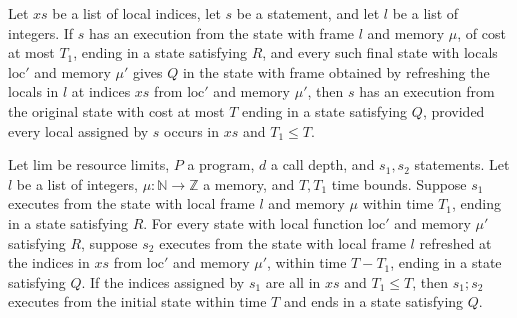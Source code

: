 \begin{theorem}
\label{Light.Ends.pieceTo}
\leanok
{}
Let $xs$ be a list of local indices, let $s$ be a statement, and let $l$ be a list of
integers. If $s$ has an execution from the state with frame $l$ and memory $\mu$, of
cost at most $T_1$, ending in a state satisfying $R$, and every such final state with
locals $\mathrm{loc}'$ and memory $\mu'$ gives $Q$ in the state with frame obtained by
refreshing the locals in $l$ at indices $xs$ from $\mathrm{loc}'$ and memory $\mu'$,
then $s$ has an execution from the original state with cost at most $T$ ending in a
state satisfying $Q$, provided every local assigned by $s$ occurs in $xs$ and $T_1\le
T$.
\end{theorem}

\begin{theorem}
\label{Light.Ends.pieceToThen}
\leanok
{}
Let $\mathrm{lim}$ be resource limits, $P$ a program, $d$ a call depth, and $s_1,s_2$
statements. Let $l$ be a list of integers, $\mu:\mathbb{N}\to\mathbb{Z}$ a memory, and
$T,T_1$ time bounds. Suppose $s_1$ executes from the state with local frame $l$ and memory
$\mu$ within time $T_1$, ending in a state satisfying $R$. For every state with local
function $\mathrm{loc}\prime$ and memory $\mu\prime$ satisfying $R$, suppose $s_2$ executes
from the state with local frame $l$ refreshed at the indices in $xs$ from $\mathrm{loc}\prime$
and memory $\mu\prime$, within time $T-T_1$, ending in a state satisfying $Q$. If the
indices assigned by $s_1$ are all in $xs$ and $T_1\le T$, then $s_1;s_2$ executes from
the initial state within time $T$ and ends in a state satisfying $Q$.
\end{theorem}

